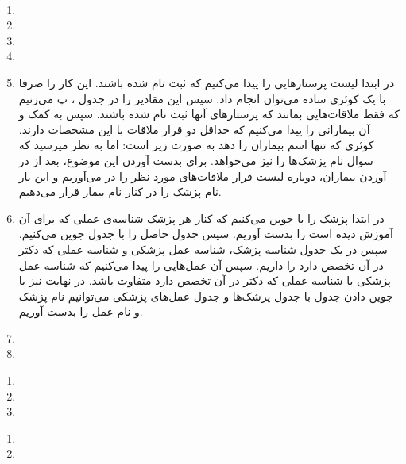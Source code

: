 \\
\begin{enumerate}
    \item \hfill {}
    \item \hfill {}
    \item \hfill {}
    \item \hfill {}
    \item در ابتدا لیست پرستار‌هایی را پیدا می‌کنیم که ثبت نام شده باشند. این کار را صرفا با یک کوئری ساده
    می‌توان انجام داد. سپس این مقادیر را در جدول
    ، پ
    می‌زنیم که فقط ملاقات‌هایی بمانند که پرستار‌های آنها ثبت نام شده باشند.
    سپس به کمک
     و 
    آن بیمارانی را پیدا می‌کنیم که حداقل دو قرار ملاقات با این مشخصات دارند. کوئری که تنها اسم بیماران را دهد
    به صورت زیر است:
    \noindent
    اما به نظر میرسید که سوال نام پزشک‌ها را نیز می‌خواهد. برای بدست آوردن این موضوع، بعد از در آوردن
    بیماران، دوباره لیست قرار ملاقات‌های مورد نظر را در می‌آوریم و این بار نام پزشک را
    در کنار نام بیمار قرار می‌دهیم.
    \item در ابتدا پزشک را با
    جوین می‌کنیم که کنار هر پزشک شناسه‌ی عملی که برای آن آموزش دیده است را بدست آوریم.
    سپس جدول حاصل را با جدول
    جوین می‌کنیم. سپس در یک جدول شناسه پزشک، شناسه عمل پزشکی و شناسه عملی که دکتر در آن تخصص دارد را داریم.
    سپس آن عمل‌هایی را پیدا می‌کنیم که شناسه عمل پزشکی با شناسه عملی که دکتر در آن تخصص دارد متفاوت باشد.
    در نهایت نیز با جوین دادن جدول با جدول پزشک‌ها و جدول عمل‌های پزشکی می‌توانیم نام پزشک و نام عمل را بدست
    آوریم.
    \item \hfill {}
    \item \hfill {}
\end{enumerate}
\begin{enumerate}
    \item \hfill {}
    \item \hfill {}
    \item \hfill {}
\end{enumerate}
\begin{enumerate}
    \item \hfill {}
    \item \hfill {}
\end{enumerate}